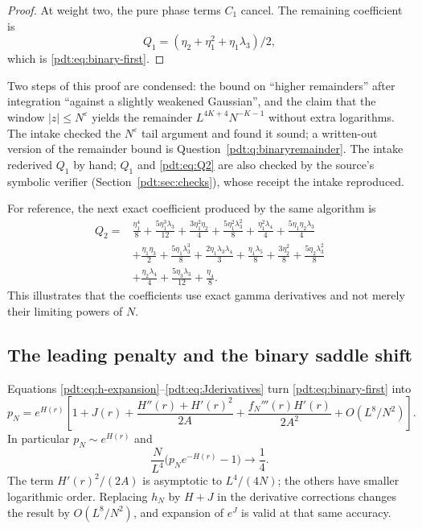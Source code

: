 \begin{proof}
At weight two, the pure phase terms $C_1$ cancel. The remaining coefficient is
\[
 Q_1=(\eta_2+\eta_1^2+\eta_1\lambda_3)/2,
\]
which is \eqref{pdt:eq:binary-first}.
\end{proof}
\begin{writenote}
Two steps of this proof are condensed: the bound on ``higher remainders''
after integration ``against a slightly weakened Gaussian'', and the claim
that the window $|z|\le N^\varepsilon$ yields the remainder
$L^{4K+4}N^{-K-1}$ without extra logarithms. The intake checked the
$N^\varepsilon$ tail argument and found it sound; a written-out version of
the remainder bound is Question~\ref{pdt:q:binaryremainder}. The intake
rederived $Q_1$ by hand; $Q_1$ and \eqref{pdt:eq:Q2} are also checked by
the source's symbolic verifier (Section~\ref{pdt:sec:checks}), whose
receipt the intake reproduced.
\end{writenote}
For reference, the next exact coefficient produced by the same algorithm is
\begin{equation}\label{pdt:eq:Q2}
\begin{split}
 Q_2={}&\frac{\eta_1^4}{8}+\frac{5\eta_1^3\lambda_3}{12}
 +\frac{3\eta_1^2\eta_2}{4}+\frac{5\eta_1^2\lambda_3^2}{8}
 +\frac{\eta_1^2\lambda_4}{4}+\frac{5\eta_1\eta_2\lambda_3}{4}\\
 &+\frac{\eta_1\eta_3}{2}+\frac{5\eta_1\lambda_3^3}{8}
 +\frac{2\eta_1\lambda_3\lambda_4}{3}+\frac{\eta_1\lambda_5}{8}
 +\frac{3\eta_2^2}{8}+\frac{5\eta_2\lambda_3^2}{8}\\
 &+\frac{\eta_2\lambda_4}{4}+\frac{5\eta_3\lambda_3}{12}+\frac{\eta_4}{8}.
\end{split}
\end{equation}
This illustrates that the coefficients use exact gamma derivatives and not merely their limiting powers of $N$.

\subsection{The leading penalty and the binary saddle shift}
Equations \eqref{pdt:eq:h-expansion}--\eqref{pdt:eq:Jderivatives} turn \eqref{pdt:eq:binary-first} into
\begin{equation}\label{pdt:eq:Hratio}
 p_N=e^{H(r)}\left[1+J(r)+\frac{H''(r)+H'(r)^2}{2A}
                +\frac{f_N'''(r)H'(r)}{2A^2}
                +O(L^8/N^2)\right].
\end{equation}
In particular $p_N\sim e^{H(r)}$ and
\begin{equation}\label{pdt:eq:Hexcess}
 \frac N{L^4}\bigl(p_Ne^{-H(r)}-1\bigr)\longrightarrow\frac14.
\end{equation}
The term $H'(r)^2/(2A)$ is asymptotic to $L^4/(4N)$; the others have smaller logarithmic order. Replacing $h_N$ by $H+J$ in the derivative corrections changes the result by $O(L^8/N^2)$, and expansion of $e^J$ is valid at that same accuracy.

